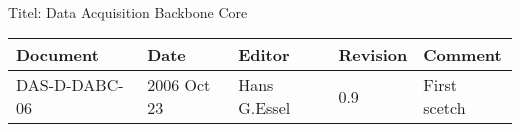 \\Titel: Data Acquisition Backbone Core
\begin{table}[h]
\begin{tabular}{|p{2.8cm}|p{2.0cm}|p{3.0cm}|p{1.6cm}|p{5.0cm}|} \hline
Document   & Date        & Editor       & Revision & Comment \\
\hline DAS-D-DABC-06 & 2006 Oct 23 & Hans G.Essel & 0.9      &
First scetch \\ \hline
\end{tabular}
\end{table}
